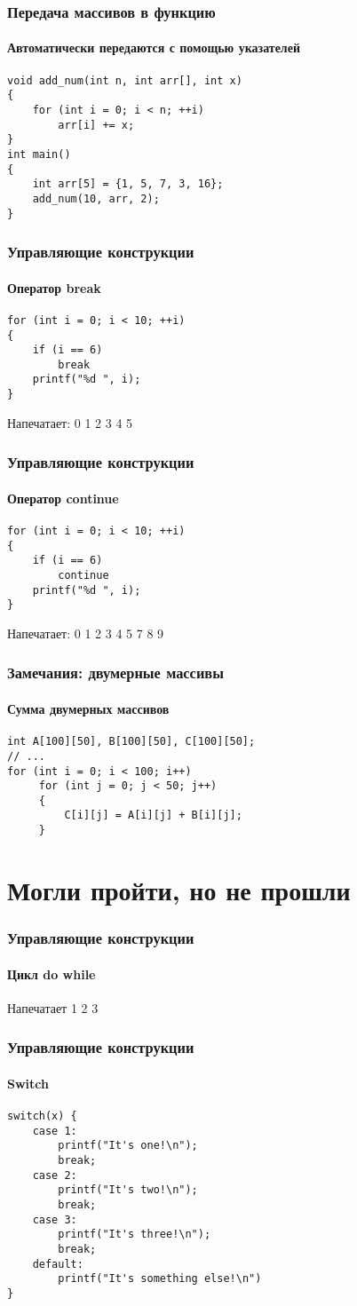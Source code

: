 \documentclass[12pt,pdf,hyperref={unicode}]{beamer}
\begin{document}
\begin{frame}[fragile]
\frametitle{Передача массивов в функцию}
\framesubtitle{Автоматически передаются с помощью указателей}
\begin{lstlisting}
void add_num(int n, int arr[], int x)
{
    for (int i = 0; i < n; ++i)
        arr[i] += x;
}
int main()
{
    int arr[5] = {1, 5, 7, 3, 16};
    add_num(10, arr, 2);
}
\end{lstlisting}
\end{frame}

\begin{frame}[fragile]
\frametitle{Управляющие конструкции} 
\framesubtitle{Оператор break}
\begin{lstlisting}
for (int i = 0; i < 10; ++i)
{
    if (i == 6)
        break
    printf("%d ", i);
}
\end{lstlisting}
Напечатает: 0 1 2 3 4 5
\end{frame}

\begin{frame}[fragile]
\frametitle{Управляющие конструкции} 
\framesubtitle{Оператор continue}
\begin{lstlisting}
for (int i = 0; i < 10; ++i)
{
    if (i == 6)
        continue
    printf("%d ", i);
}
\end{lstlisting}
Напечатает: 0 1 2 3 4 5 7 8 9
\end{frame}

\begin{frame}[fragile]
\frametitle{Замечания: двумерные массивы}
\framesubtitle{Сумма двумерных массивов}
\begin{lstlisting}
int A[100][50], B[100][50], C[100][50];
// ... 
for (int i = 0; i < 100; i++)
     for (int j = 0; j < 50; j++)
     {
         C[i][j] = A[i][j] + B[i][j];
     }
\end{lstlisting}
\end{frame}



\section{Могли пройти, но не прошли}



\begin{frame}
\frametitle{Управляющие конструкции} 
\framesubtitle{Цикл do while}

Напечатает 1 2 3 
\end{frame}

\begin{frame}[fragile]
\frametitle{Управляющие конструкции} 
\framesubtitle{Switch}
\begin{lstlisting}
switch(x) {
    case 1:
        printf("It's one!\n");
        break;
    case 2:
        printf("It's two!\n");
        break;
    case 3:
        printf("It's three!\n");
        break;
    default:
        printf("It's something else!\n")
}
\end{lstlisting}
\end{frame}
\end{document}
